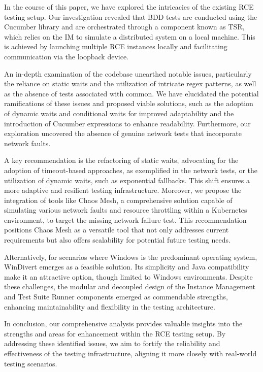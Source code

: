In the course of this paper, we have explored the intricacies of the existing RCE testing setup. Our investigation revealed that \acf{BDD} tests are conducted using the Cucumber library and are orchestrated through a component known as \acf{TSR}, which relies on the \acf{IM} to simulate a distributed system on a local machine. This is achieved by launching multiple RCE instances locally and facilitating communication via the loopback device. 

An in-depth examination of the codebase unearthed notable issues, particularly the reliance on static waits and the utilization of intricate regex patterns, as well as the absence of tests associated with common. We have elucidated the potential ramifications of these issues and proposed viable solutions, such as the adoption of dynamic waits and conditional waits for improved adaptability and the introduction of Cucumber expressions to enhance readability. Furthermore, our exploration uncovered the absence of genuine network tests that incorporate network faults.

A key recommendation is the refactoring of static waits, advocating for the adoption of timeout-based approaches, as exemplified in the network tests, or the utilization of dynamic waits, such as exponential fallbacks. This shift ensures a more adaptive and resilient testing infrastructure.
Moreover, we propose the integration of tools like Chaos Mesh, a comprehensive solution capable of simulating various network faults and resource throttling within a Kubernetes environment, to target the missing network failure test. This recommendation positions Chaos Mesh as a versatile tool that not only addresses current requirements but also offers scalability for potential future testing needs. 

Alternatively, for scenarios where Windows is the predominant operating system, WinDivert emerges as a feasible solution. Its simplicity and Java compatibility make it an attractive option, though limited to Windows environments. Despite these challenges, the modular and decoupled design of the Instance Management and Test Suite Runner components emerged as commendable strengths, enhancing maintainability and flexibility in the testing architecture.

In conclusion, our comprehensive analysis provides valuable insights into the strengths and areas for enhancement within the RCE testing setup. By addressing these identified issues, we aim to fortify the reliability and effectiveness of the testing infrastructure, aligning it more closely with real-world testing scenarios.